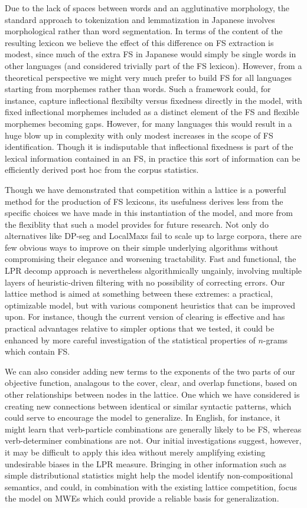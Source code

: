 \documentclass[11pt,letterpaper]{article}
\begin{document}
Due to the lack of spaces between words and an agglutinative morphology, the standard approach to tokenization and lemmatization in Japanese involves morphological rather than word segmentation. In terms of the content of the resulting lexicon we believe the effect of this difference on FS extraction is modest, since much of the extra FS in Japanese would simply be single words in other languages (and considered trivially part of the FS lexicon). However, from a theoretical perspective we might very much prefer to build FS for all languages starting from morphemes rather than words. Such a framework could, for instance, capture inflectional flexibilty versus fixedness directly in the model, with fixed inflectional morphemes included as a distinct element of the FS and flexible morphemes becoming gaps. However, for many languages this would result in a huge blow up in complexity with only modest increases in the scope of FS identification. Though it is indisputable that inflectional fixedness is part of the lexical information contained in an FS, in practice this sort of information can be efficiently derived post hoc from the corpus statistics.

Though we have demonstrated that competition within a lattice is a powerful method for the production of FS lexicons, its usefulness derives less from the specific choices we have made in this instantiation of the model, and more from the flexiblity that such a model provides for future research. Not only do alternatives like DP-seg and LocalMaxs fail to scale up to large corpora, there are few obvious ways to improve on their simple underlying algorithms without compromising their elegance and worsening tractability. Fast and functional, the LPR decomp approach is nevertheless algorithmically ungainly, involving multiple layers of heuristic-driven filtering with no possibility of correcting errors. Our lattice method is aimed at something between these extremes: a practical, optimizable model, but with various component heuristics that can be improved upon. For instance, though the current version of clearing is effective and has practical advantages relative to simpler options that we tested, it could be enhanced by more careful investigation of the statistical properties of $n$-grams which contain FS.

We can also consider adding new terms to the exponents of the two parts of our objective function, analagous to the cover, clear, and overlap functions, based on other relationships between nodes in the lattice. One which we have considered is creating new connections between identical or similar syntactic patterns, which could serve to encourage the model to generalize. In English, for instance, it might learn that verb-particle combinations are generally likely to be FS, whereas verb-determiner combinations are not. Our initial investigations suggest, however, it may be difficult to apply this idea without merely amplifying existing undesirable biases in the LPR measure. Bringing in other information such as simple distributional statistics might help the model identify non-compositional semantics, and could, in combination with the existing lattice competition, focus the model on MWEs which could provide a reliable basis for generalization.
\end{document}
